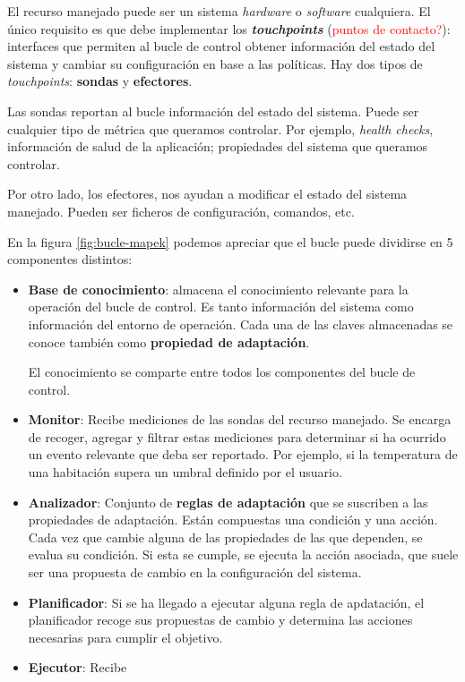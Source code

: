

El recurso manejado puede ser un sistema \emph{hardware} o \emph{software} cualquiera. El único requisito es que debe implementar los \textbf{\emph{touchpoints}} (\textcolor{red}{puntos de contacto?}): interfaces que permiten al bucle de control obtener información del estado del sistema y cambiar su configuración en base a las políticas. Hay dos tipos de \emph{touchpoints}: \textbf{sondas} y \textbf{efectores}.

Las sondas reportan al bucle información del estado del sistema. Puede ser cualquier tipo de métrica que queramos controlar. Por ejemplo, \emph{health checks}, información de salud de la aplicación; propiedades del sistema que queramos controlar.

Por otro lado, los efectores, nos ayudan a modificar el estado del sistema manejado. Pueden ser ficheros de configuración, comandos, etc.

En la figura \ref{fig:bucle-mapek} podemos apreciar que el bucle puede dividirse en 5 componentes distintos: \cite{ArchitecturalBlueprintAutonomic2006}

\begin{itemize}
  \item \textbf{Base de conocimiento}: almacena el conocimiento relevante para la operación del bucle de control. Es tanto información del sistema como información del entorno de operación. Cada una de las claves almacenadas se conoce también como \textbf{propiedad de adaptación}.

  El conocimiento se comparte entre todos los componentes del bucle de control.

  \item \textbf{Monitor}: Recibe mediciones de las sondas del recurso manejado. Se encarga de recoger, agregar y filtrar estas mediciones para determinar si ha ocurrido un evento relevante que deba ser reportado. Por ejemplo, si la temperatura de una habitación supera un umbral definido por el usuario.

  \item \textbf{Analizador}: Conjunto de \textbf{reglas de adaptación} que se suscriben a las propiedades de adaptación. Están compuestas una condición y una acción. Cada vez que cambie alguna de las propiedades de las que dependen, se evalua su condición. Si esta se cumple, se ejecuta la acción asociada, que suele ser una propuesta de cambio en la configuración del sistema.

  \item \textbf{Planificador}: Si se ha llegado a ejecutar alguna regla de apdatación, el planificador recoge sus propuestas de cambio y determina las acciones necesarias para cumplir el objetivo.

  \item \textbf{Ejecutor}: Recibe
\end{itemize}


